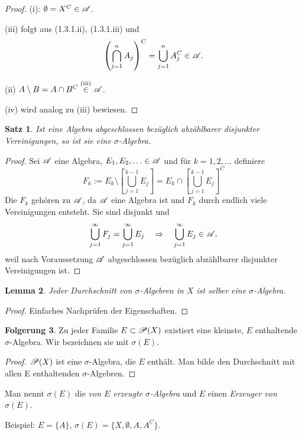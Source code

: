 \documentclass[
 a4paper,
 12pt,
 parskip=half
 ]{scrreprt}
\theoremstyle{plain}
\newtheorem{thm}{Satz}[section] %
\newtheorem{lem}[thm]{Lemma}
\theoremstyle{definition}
\newtheorem{folg}[thm]{Folgerung}
\numberwithin{equation}{section}
\begin{document}
\begin{proof}
 (i): $\emptyset = X^C \in \mathscr{A}$.
  
 (iii) folgt aus (1.3.1.ii), (1.3.1.iii) und 
 \[ \left( \bigcap_{j=1}^n A_j \right)^C = \bigcup_{j=1}^n A_j^C \in \mathscr{A}. \]
 
 (ii) $A \setminus B = A \cap B^C \overset{\text{(iii)}}\in \mathscr{A}$.
 
 (iv) wird analog zu (iii) bewiesen.
\end{proof}

\begin{thm}
 Ist eine Algebra abgeschlossen bezüglich abzählbarer \emph{disjunkter} Vereinigungen, so ist sie eine $\sigma$-Algebra.
\end{thm}

\begin{proof}
 Sei $\mathscr{A}$ eine Algebra, $E_1, E_2, \ldots \in \mathscr{A}$ und für $k = 1, 2, \ldots$ definiere
 \[ F_k := E_k \setminus \left[ \bigcup_{j=1}^{k-1} E_j \right] = E_k \cap \left[ \bigcup_{j=1}^{k-1} E_j \right]^C \]
 Die $F_k$ gehören zu $\mathscr{A}$, da $\mathscr{A}$ eine Algebra ist und $F_k$ durch endlich viele Vereinigungen entsteht. Sie sind disjunkt und
 \[ \bigcup_{j=1}^\infty F_j = \bigcup_{j=1}^\infty E_j \quad \Rightarrow \quad \bigcup_{j=1}^\infty E_j \in \mathscr{A}, \]
 weil nach Voraussetzung $\mathscr{A}$ abgeschlossen bezüglich abzählbarer disjunkter Vereinigungen ist.
\end{proof}

\begin{lem}
 Jeder Durchschnitt von $\sigma$-Algebren in $X$ ist selber eine $\sigma$-Algebra.
\end{lem}

\begin{proof}
 Einfaches Nachprüfen der Eigenschaften.
\end{proof}

\begin{folg}
 Zu jeder Familie $E \subset \mathscr{P}(X)$ existiert eine kleinste, $E$ enthaltende $\sigma$-Algebra. Wir bezeichnen sie mit $\sigma(E)$.
\end{folg}

\begin{proof}
 $\mathscr{P}(X)$ ist eine $\sigma$-Algebra, die $E$ enthält. Man bilde den Durchschnitt mit allen E enthaltenden $\sigma$-Algebren.
\end{proof}

Man nennt $\sigma(E)$ die \emph{von $E$ erzeugte $\sigma$-Algebra} und $E$ einen \emph{Erzeuger von $\sigma(E)$}.

Beispiel: $E = \{A\}$, $\sigma(E) = \{ X, \emptyset, A, A^C \}$.
\end{document}
